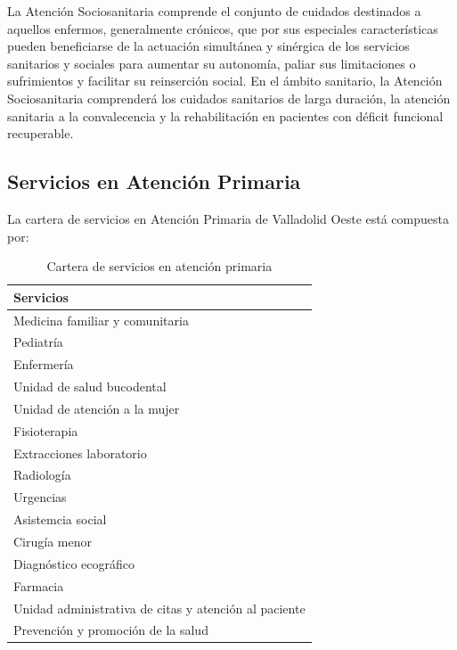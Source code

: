 La Atención Sociosanitaria comprende el conjunto de cuidados destinados a aquellos enfermos, generalmente crónicos, que por sus especiales características pueden beneficiarse de la actuación simultánea y sinérgica de los servicios sanitarios y sociales para aumentar su autonomía, paliar sus limitaciones o sufrimientos y facilitar su reinserción social. En el ámbito sanitario, la Atención Sociosanitaria comprenderá los cuidados sanitarios de larga duración, la atención sanitaria a la convalecencia y la rehabilitación en pacientes con déficit funcional recuperable.

\subsection{Servicios en Atención Primaria}

La cartera de servicios en Atención Primaria de Valladolid Oeste está compuesta por:

\begin{table}[H]
    \centering
    \begin{tabular}{l}
        \toprule
        Servicios                                             \\
        \midrule
        Medicina familiar y comunitaria                       \\
        Pediatría                                             \\
        Enfermería                                            \\
        Unidad de salud bucodental                            \\
        Unidad de atención a la mujer                         \\
        Fisioterapia                                          \\
        Extracciones laboratorio                              \\
        Radiología                                            \\
        Urgencias                                             \\
        Asistemcia social                                     \\
        Cirugía menor                                         \\
        Diagnóstico ecográfico                                \\
        Farmacia                                              \\
        Unidad administrativa de citas y atención al paciente \\
        Prevención y promoción de la salud                    \\
        \bottomrule
    \end{tabular}
    \caption{Cartera de servicios en atención primaria}
\end{table}

